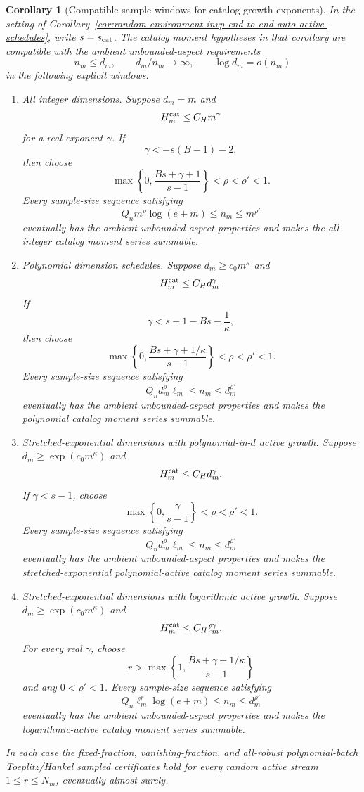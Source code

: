 \documentclass[11pt]{amsart}
\numberwithin{equation}{section}
\newtheorem{corollary}[theorem]{Corollary}
\theoremstyle{definition}
\theoremstyle{remark}
\begin{document}
\begin{corollary}[Compatible sample windows for catalog-growth exponents]
\label{cor:random-environment-invp-end-to-end-auto-active-compatible-windows}
In the setting of
Corollary~\ref{cor:random-environment-invp-end-to-end-auto-active-schedules},
write \(s=s_{\rm cat}\).  The catalog moment hypotheses in that corollary are
compatible with the ambient unbounded-aspect requirements
\[
  n_m\le d_m,\qquad d_m/n_m\to\infty,\qquad \log d_m=o(n_m)
\]
in the following explicit windows.

\begin{enumerate}[label=\textup{(\roman*)},leftmargin=2.2em]
\item All integer dimensions.  Suppose \(d_m=m\) and
\[
  H_m^{\rm cat}\le C_Hm^\gamma
\]
for a real exponent \(\gamma\).  If
\[
  \gamma<-s(B-1)-2,
\]
then choose
\[
  \max\left\{0,\frac{Bs+\gamma+1}{s-1}\right\}<\rho<\rho'<1 .
\]
Every sample-size sequence satisfying
\[
  Q_n m^\rho\log(e+m)\le n_m\le m^{\rho'}
\]
eventually has the ambient unbounded-aspect properties and makes the
all-integer catalog moment series summable.

\item Polynomial dimension schedules.  Suppose \(d_m\ge c_0m^\kappa\) and
\[
  H_m^{\rm cat}\le C_Hd_m^\gamma .
\]
If
\[
  \gamma<s-1-Bs-\frac1\kappa,
\]
then choose
\[
  \max\left\{0,\frac{Bs+\gamma+1/\kappa}{s-1}\right\}<\rho<\rho'<1 .
\]
Every sample-size sequence satisfying
\[
  Q_n d_m^\rho\ell_m\le n_m\le d_m^{\rho'}
\]
eventually has the ambient unbounded-aspect properties and makes the polynomial
catalog moment series summable.

\item Stretched-exponential dimensions with polynomial-in-\(d\) active growth.
Suppose \(d_m\ge\exp(c_0m^\kappa)\) and
\[
  H_m^{\rm cat}\le C_Hd_m^\gamma .
\]
If \(\gamma<s-1\), choose
\[
  \max\left\{0,\frac{\gamma}{s-1}\right\}<\rho<\rho'<1 .
\]
Every sample-size sequence satisfying
\[
  Q_n d_m^\rho\ell_m\le n_m\le d_m^{\rho'}
\]
eventually has the ambient unbounded-aspect properties and makes the
stretched-exponential polynomial-active catalog moment series summable.

\item Stretched-exponential dimensions with logarithmic active growth.  Suppose
\(d_m\ge\exp(c_0m^\kappa)\) and
\[
  H_m^{\rm cat}\le C_H\ell_m^\gamma .
\]
For every real \(\gamma\), choose
\[
  r>\max\left\{1,\frac{Bs+\gamma+1/\kappa}{s-1}\right\}
\]
and any \(0<\rho'<1\).  Every sample-size sequence satisfying
\[
  Q_n\ell_m^r\log(e+m)\le n_m\le d_m^{\rho'}
\]
eventually has the ambient unbounded-aspect properties and makes the
logarithmic-active catalog moment series summable.
\end{enumerate}
In each case the fixed-fraction, vanishing-fraction, and all-robust
polynomial-batch Toeplitz/Hankel sampled certificates hold for every random
active stream \(1\le r\le N_m\), eventually almost surely.
\end{corollary}
\end{document}
